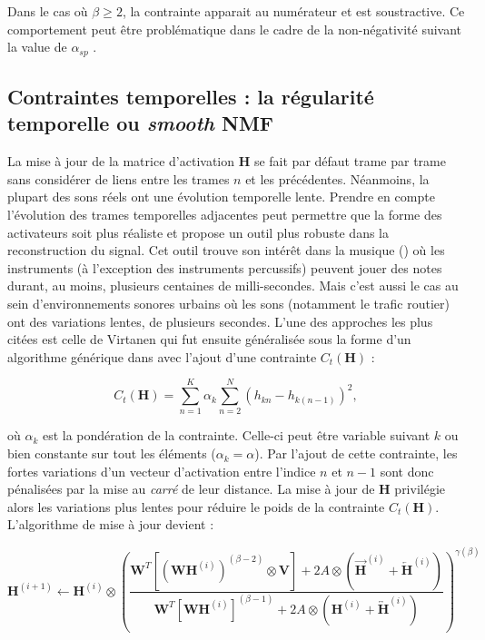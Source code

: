 Dans le cas où $\beta \geq 2$, la contrainte apparait au numérateur et est soustractive. Ce comportement peut être problématique dans le cadre de la non-négativité suivant la value de $\alpha_{sp}$ \cite{fevotte_algorithms_2011}.

\subsection{Contraintes temporelles : la régularité temporelle ou \textit{smooth} NMF}

La mise à jour de la matrice d'activation $\mathbf{H}$ se fait par défaut trame par trame sans considérer de liens entre les trames $n$ et les précédentes. Néanmoins, la plupart des sons réels ont une évolution temporelle lente. Prendre en compte l'évolution des trames temporelles adjacentes peut permettre que la forme des activateurs soit plus réaliste et propose un outil plus robuste dans la reconstruction du signal. Cet outil trouve son intérêt dans la musique (\cite{virtanen_sound_2003, fevotte_majorization-minimization_2011}) où les instruments (à l'exception des instruments percussifs) peuvent jouer des notes durant, au moins, plusieurs centaines de milli-secondes. Mais c'est aussi le cas au sein d'environnements sonores urbains où les sons (notamment le trafic routier) ont des variations lentes, de plusieurs secondes. L'une des approches les plus citées est celle de Virtanen \cite{virtanen_monaural_2007} qui fut ensuite généralisée sous la forme d'un algorithme générique dans \cite{fevotte2017single} avec l'ajout d'une contrainte $C_t(\mathbf{H})$ :

\begin{equation}\label{eq:smoothnessVirtanen}
C_t(\mathbf{H}) = \sum_{n=1}^K \alpha_k\sum_{n=2}^N \left(h_{kn} - h_{k(n-1)}\right)^2,
\end{equation}

où $\alpha_k$ est la pondération de la contrainte. Celle-ci peut être variable suivant $k$ ou bien constante sur tout les éléments ($\alpha_k = \alpha$). Par l'ajout de cette contrainte, les fortes variations d'un vecteur d'activation entre l'indice $n$ et $n-1$ sont donc pénalisées par la mise au \textit{carré} de leur distance. La mise à jour de $\mathbf{H}$ privilégie alors les variations plus lentes pour réduire le poids de la contrainte $C_t(\mathbf{H})$. L'algorithme de mise à jour devient :

\begin{equation}
\textbf{H}^{(i+1)} \leftarrow \textbf{H}^{(i)} \otimes\left(\frac{\textbf{W}^T \left[\left(\textbf{WH}^{(i)} \right)^{(\beta-2)} \otimes \textbf{V} \right] + 2 A \otimes \left(\overrightarrow{\mathbf{H}}^{(i)} + \overleftarrow{\mathbf{H}}^{(i)} \right)}{\textbf{W}^T \left[\textbf{WH}^{(i)} \right]^{(\beta-1)} + 2 A \otimes \left(\mathbf{H}^{(i)} + \overleftrightarrow{\mathbf{H}}^{(i)} \right)}\right)^{\gamma(\beta)}\label{eq:HupdateSmooth}
\end{equation}

